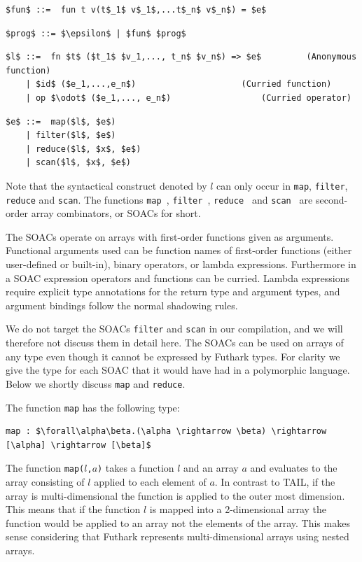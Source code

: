 \documentclass[11pt]{article}
\begin{document}
\begin{lstlisting}[numbers=none,frame=none]
$fun$ ::=  fun t v(t$_1$ v$_1$,...t$_n$ v$_n$) = $e$
\end{lstlisting}

\begin{lstlisting}[numbers=none,frame=none]
$prog$ ::= $\epsilon$ | $fun$ $prog$
\end{lstlisting}

\begin{lstlisting}[numbers=none,frame=none]
$l$ ::=  fn $t$ ($t_1$ $v_1,..., t_n$ $v_n$) => $e$			(Anonymous function)
    | $id$ ($e_1,...,e_n$)					   (Curried function)
    | op $\odot$ ($e_1,..., e_n$)			   	   (Curried operator)
\end{lstlisting}

\begin{lstlisting}[numbers=none,frame=none]
$e$ ::=  map($l$, $e$)					
    | filter($l$, $e$)
    | reduce($l$, $x$, $e$)
    | scan($l$, $x$, $e$)
\end{lstlisting}




Note that the syntactical construct denoted by $l$ can only occur in {\tt map}, {\tt filter}, {\tt reduce} and {\tt scan}.
The functions {\tt map }, {\tt filter }, {\tt reduce } and {\tt scan } are second-order array combinators, or SOACs for short.

The SOACs operate on arrays with first-order functions given as arguments.
Functional arguments used can be function names of first-order functions (either user-defined or built-in), 
binary operators, or lambda expressions.
Furthermore in a SOAC expression operators and functions can be curried. Lambda expressions require explicit type annotations for
the return type and argument types, and argument bindings follow the normal shadowing rules.

We do not target the SOACs {\tt filter} and {\tt scan} in our compilation, and we will therefore not discuss them in detail here.
The SOACs can be used on arrays of any type even though it cannot be expressed by Futhark types.
For clarity we give the type for each SOAC that it would have had in a polymorphic language.
Below we shortly discuss {\tt map} and {\tt reduce}.

The function {\tt map} has the following type: 
\begin{lstlisting}[numbers=none,frame=none]
map : $\forall\alpha\beta.(\alpha \rightarrow \beta) \rightarrow [\alpha] \rightarrow [\beta]$
\end{lstlisting}
The function {\tt map($l$,$a$)} takes a function $l$ and an array $a$ and evaluates to the array consisting of $l$ applied to each element of $a$.
In contrast to TAIL, if the array is multi-dimensional the function is applied to the outer most dimension.
This means that if the function $l$ is mapped into a 2-dimensional array the function would be applied to an array not the elements
of the array. This makes sense considering that Futhark represents multi-dimensional arrays using nested arrays.
\end{document}
